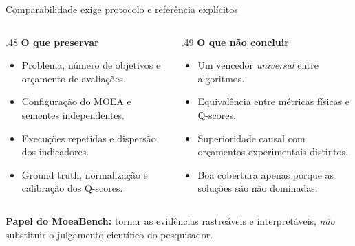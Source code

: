 \begin{frame}{Comparabilidade exige protocolo e referência explícitos}
\begin{columns}[T,onlytextwidth]
\begin{column}{.48\textwidth}
\textbf{O que preservar}\par\smallskip
\begin{itemize}\setlength\itemsep{4pt}
\item Problema, número de objetivos e orçamento de avaliações.
\item Configuração do MOEA e sementes independentes.
\item Execuções repetidas e dispersão dos indicadores.
\item Ground truth, normalização e calibração dos Q-scores.
\end{itemize}
\end{column}
\begin{column}{.49\textwidth}
\textbf{O que não concluir}\par\smallskip
\begin{itemize}\setlength\itemsep{4pt}
\item Um vencedor \emph{universal} entre algoritmos.
\item Equivalência entre métricas físicas e Q-scores.
\item Superioridade causal com orçamentos experimentais distintos.
\item Boa cobertura apenas porque as soluções são não dominadas.
\end{itemize}
\end{column}
\end{columns}
\vspace{.10cm}
\textbf{Papel do MoeaBench:} tornar as evidências rastreáveis e interpretáveis, \emph{não} substituir o julgamento científico do pesquisador.
\end{frame}

